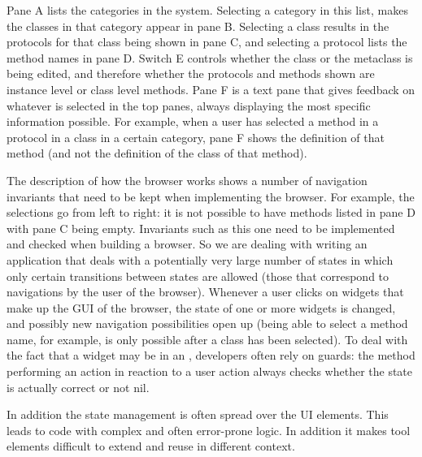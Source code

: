 \documentclass[a4paper,10pt,twoside]{book}
\begin{document}

Pane A lists the categories in the system. Selecting a category in this list, makes the classes in that category appear in pane B. Selecting a class results in the protocols for that class being shown in pane C, and selecting a protocol lists the method names in pane D. Switch E controls whether the class or the metaclass is being edited, and therefore whether the protocols and methods shown are instance level or class level methods. Pane F is a text pane that gives feedback on whatever is selected in the top panes, always displaying the most specific information possible. For example, when a user has selected a method in a protocol in a class in a certain category, pane F shows the definition of that method (and not the definition of the class of that method). 

The description of how the browser works shows a number of navigation invariants that need to be kept when implementing the browser. For example, the selections go from left to right: it is not possible to have methods listed in pane D with pane C being empty.
Invariants such as this one need to be implemented and checked when building a browser. So we are dealing with writing an application that deals with a potentially very large number of states in which only certain transitions between states are allowed (\ie those that correspond to navigations by the user of the browser). Whenever a user clicks on widgets that make up the GUI of the browser, the state of one or more widgets is changed, and possibly new navigation possibilities open up (being able to select a method name, for example, is only possible after a class has been selected). To deal with the fact that a widget may be in an  , developers often rely on guards: the method performing an action in reaction to a user action always checks whether the state is actually correct or not nil. 

In addition the state management is often spread over the UI elements. This leads to code with complex and often error-prone logic. In addition it makes tool elements difficult to extend and reuse in different context. 
\end{document}
